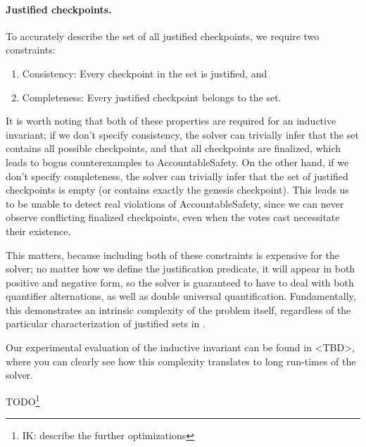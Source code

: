 \paragraph{Justified checkpoints.} To accurately describe the set of all justified checkpoints, we require two constraints:
\begin{enumerate}
	\item Consistency: Every checkpoint in the set is justified, and 
	\item Completeness: Every justified checkpoint belongs to the set.
\end{enumerate}
It is worth noting that both of these properties are required for an inductive invariant; if we don't specify consistency, the solver can trivially infer that the set contains all possible checkpoints, and that all checkpoints are finalized, which leads to bogus counterexamples to \textsf{AccountableSafety}.
On the other hand, if we don't specify completeness, the solver can trivially infer that the set of justified checkpoints is empty (or contains exactly the genesis checkpoint). This leads us to be unable to detect real violations of \textsf{AccountableSafety}, since we can never observe conflicting finalized checkpoints, even when the votes cast necessitate their existence.

This matters, because including both of these constraints is expensive for the solver; no matter how we define the justification predicate, it will appear in both positive and negative form, so the solver is guaranteed to have to deal with both quantifier alternations, as well as double universal quantification.
Fundamentally, this demonstrates an intrinsic complexity of the problem itself, regardless of the particular characterization of justified sets in \tlap{}.

Our experimental evaluation of the inductive invariant can be found in <TBD>, where you can clearly see how this complexity translates to long run-times of the solver.


TODO\footnote{IK: describe the further optimizations}

